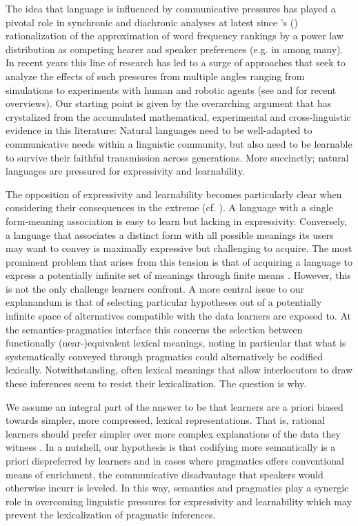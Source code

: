 \documentclass[a4paper]{article}
\newcommand{\citeposs}[2][]{\citeauthor{#2}'s (\citeyear[#1]{#2})}
\begin{document}
The idea that language is influenced by communicative pressures has played a pivotal role in synchronic and diachronic analyses at latest since \citeposs{zipf:1949} rationalization of the approximation of word frequency rankings by a power law distribution as competing hearer and speaker preferences (e.g. in \citealt{martinet:1962, horn:1984,jaeger+vRooij:2007,jaeger:2007, piantadosi:2014,kirby+etal:2015} among many). In recent years this line of research has led to a surge of approaches that seek to analyze the effects of such pressures from multiple angles ranging from simulations to experiments with human and robotic agents (see \citealt{steels:2015} and \citealt{tamariz+kirby:2016} for recent overviews). Our starting point is given by the overarching argument that has crystalized from the accumulated mathematical, experimental and cross-linguistic evidence in this literature: Natural languages need to be well-adapted to communicative needs within a linguistic community, but also need to be learnable to survive their faithful transmission across generations. More succinctly; natural languages are pressured for expressivity and learnability.   

The opposition of expressivity and learnability becomes particularly clear when considering their consequences in the extreme (cf. \citealt{kemp+regier:2012,kirby+etal:2015}). A language with a single form-meaning association is easy to learn but lacking in expressivity. Conversely, a language that associates a distinct form with all possible meanings its users may want to convey is maximally expressive but challenging to acquire. The most prominent problem that arises from this tension is that of acquiring a language to express a potentially infinite set of meanings through finite means \citep{kirby:2002}. However, this is not the only challenge learners confront. A more central issue to our explanandum is that of selecting particular hypotheses out of a potentially infinite space of alternatives compatible with the data learners are exposed to. At the semantics-pragmatics interface this concerns the selection between functionally (near-)equivalent lexical meanings, noting in particular that what is systematically conveyed through pragmatics could alternatively be codified lexically. Notwithstanding, often lexical meanings that allow interlocutors to draw these inferences seem to resist their lexicalization. The question is why.

We assume an integral part of the answer to be that learners are a priori biased towards simpler, more compressed, lexical representations. That is, rational learners should prefer simpler over more complex explanations of the data they witness \citep{feldman:2000, chater+vitanyi:2003, piantadosi+etal:2012a, kirby+etal:2015,piantadosi+etal:underreview}. In a nutshell, our hypothesis is that codifying more semantically is a priori dispreferred by learners and in cases where pragmatics offers conventional means of enrichment, the communicative disadvantage that speakers would otherwise incurr is leveled. In this way, semantics and pragmatics play a synergic role in overcoming linguistic pressures for expressivity and learnability which may prevent the lexicalization of pragmatic inferences.  
\end{document}
